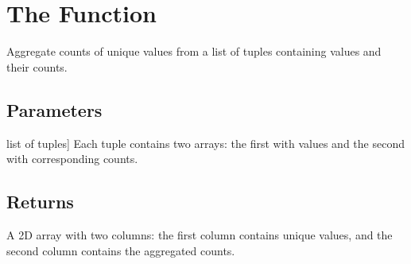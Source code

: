 \documentclass[a4paper,11pt,openany,english]{sphinxmanual}
\begin{document}
\section{The  Function}
\label{\detokenize{api_bootstrap:the-aggregate-boot-function}}

\begin{fulllineitems}
\label{\detokenize{api_bootstrap:xtremes.bootstrap.aggregate_boot}}
\pysigstartsignatures
{}
\pysigstopsignatures
\sphinxAtStartPar
Aggregate counts of unique values from a list of tuples containing values and their counts.


\subsection{Parameters}
\label{\detokenize{api_bootstrap:id17}}\begin{description}
\sphinxlineitem{boot\_samp}{[}list of tuples{]}
\sphinxAtStartPar
Each tuple contains two arrays: the first with values and the second with corresponding counts.

\end{description}


\subsection{Returns}
\label{\detokenize{api_bootstrap:id18}}\begin{description}
\sphinxAtStartPar
A 2D array with two columns: the first column contains unique values, and the second column contains the aggregated counts.

\end{description}



\end{fulllineitems}
\end{document}
